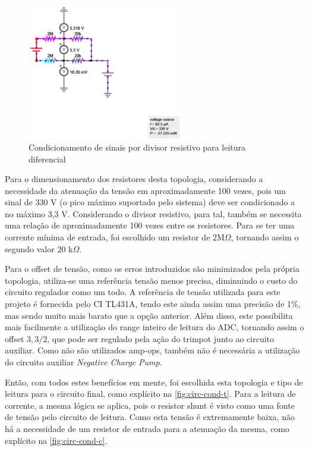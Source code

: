 \begin{figure}[htb!]
    \caption{Condicionamento de sinais por divisor resistivo para leitura diferencial}
    \label{fig:difread}
    \includegraphics[width=0.6\textwidth]{figuras/difread.png}
    \fonte{}
\end{figure}

Para o dimensionamento dos resistores desta topologia, considerando a necessidade da atenuação da tensão em aproximadamente 100 vezes, pois um sinal de 330 V (o pico máximo suportado pelo sistema) deve ser condicionado a no máximo 3,3 V. Considerando o divisor resistivo, para tal, também se necessita uma relação de aproximadamente 100 vezes entre os resistores. Para se ter uma corrente mínima de entrada, foi escolhido um resistor de 2M$\Omega$, tornando assim o segundo valor 20 k$\Omega$.

Para o offset de tensão, como os erros introduzidos são minimizados pela própria topologia, utiliza-se uma referência tensão menos precisa, diminuindo o custo do circuito regulador como um todo. A referência de tensão utilizada para este projeto é fornecida pelo \gls{CI} TL431A, tendo este ainda assim uma precisão de 1\%, mas sendo muito mais barato que a opção anterior. Além disso, este possibilita mais facilmente a utilização do range inteiro de leitura do \gls{ADC}, tornando assim o offset $3,3/2$, que pode ser regulado pela ação do trimpot junto ao circuito auxiliar. Como não são utilizados \gls{amp-op}s, também não é necessária a utilização do circuito auxiliar \textit{Negative Charge Pump}.

Então, com todos estes benefícios em mente, foi escolhida esta topologia e tipo de leitura para o circuito final, como explícito na \autoref{fig:circ-cond-t}. Para a leitura de corrente, a mesma lógica se aplica, pois o resistor shunt é visto como uma fonte de tensão pelo circuito de leitura. Como esta tensão é extremamente baixa, não há a necessidade de um resistor de entrada para a atenuação da mesma, como explícito na \autoref{fig:circ-cond-c}.

